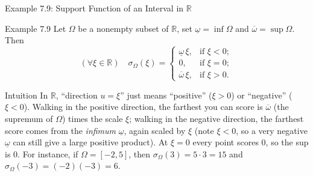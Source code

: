 \documentclass[aspectratio=169,10pt]{beamer}
\newcommand{\R}{\mathbb{R}}
\begin{document}
\begin{frame}{Example 7.9: Support Function of an Interval in $\R$}

  \begin{exampleblock}{Example 7.9}
    Let $\Omega$ be a nonempty subset of $\R$, set $\underline\omega = \inf
    \Omega$ and $\overline\omega = \sup \Omega$. Then
    \[
      (\forall \xi \in \R) \quad \sigma_\Omega(\xi) =
      \begin{cases}
        \underline\omega\,\xi, & \text{if } \xi < 0; \\
        0, & \text{if } \xi = 0; \\
        \overline\omega\,\xi, & \text{if } \xi > 0.
      \end{cases}
      \tag{7.5}
    \]
  \end{exampleblock}

  \begin{block}{Intuition}
    In $\R$, ``direction $u=\xi$'' just means ``positive'' ($\xi>0$) or
    ``negative'' ($\xi<0$). Walking in the positive direction, the farthest
    you can score is $\overline\omega$ (the supremum of $\Omega$) times the
    scale $\xi$; walking in the negative direction, the farthest score comes
    from the \emph{infimum} $\underline\omega$, again scaled by $\xi$ (note
    $\xi<0$, so a very negative $\underline\omega$ can still give a large
    positive product). At $\xi=0$ every point scores $0$, so the sup is $0$.
    For instance, if $\Omega = [-2,5]$, then $\sigma_\Omega(3) = 5\cdot 3=15$
    and $\sigma_\Omega(-3) = (-2)(-3) = 6$.
  \end{block}

\end{frame}
\end{document}
